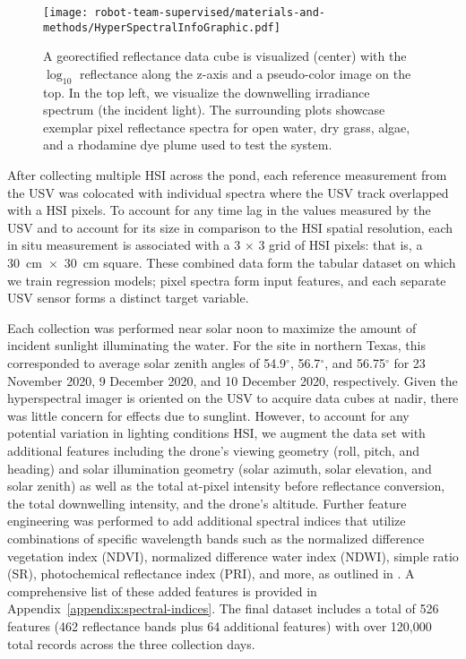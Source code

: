 \begin{figure}[H]
  \centering
  \texttt{[image: robot-team-supervised/materials-and-methods/HyperSpectralInfoGraphic.pdf]}
  \caption{A georectified reflectance data cube is visualized (center) with the
    $\log_{10}$ reflectance along the z-axis and a pseudo-color image on the
    top. In the top left, we visualize the downwelling irradiance spectrum (the
    incident light). The surrounding plots showcase exemplar pixel reflectance
    spectra for open water, dry grass, algae, and a rhodamine dye plume used to
    test the system.\label{fig:hsi-infographic}}
\end{figure}


After collecting multiple HSI across the pond, each reference measurement from
the USV was colocated with individual spectra where the USV track overlapped
with a HSI pixels. To account for any time lag in the values measured by the USV
and to account for its size in comparison to the HSI spatial resolution, each in
situ measurement is associated with a 3 $\times$ 3 grid of HSI pixels: that is, a
\mbox{30 cm $\times$ 30 cm} square. These combined data form the tabular dataset on which
we train regression models; pixel spectra form input features, and each separate
USV sensor forms a distinct target variable.


Each collection was performed near solar noon to maximize the amount of incident
sunlight illuminating the water. For the site in northern Texas, this
corresponded to average solar zenith angles of 54.9$^{\circ}$, 56.7$^{\circ}$,
and 56.75$^{\circ}$ for 23 November 2020, 9 December 2020, and 10 December 2020,
respectively. Given the hyperspectral imager is oriented on the USV to acquire
data cubes at nadir, there was little concern for effects due to sunglint.
However, to account for any potential variation in lighting conditions 
HSI, we augment the data set with additional features including the
drone's viewing geometry (roll, pitch, and heading) and solar illumination
geometry (solar azimuth, solar
elevation, and solar zenith) as well as the total at-pixel intensity before
reflectance conversion, the total downwelling intensity, and the drone's
altitude. Further feature engineering was performed to add additional spectral
indices that utilize combinations of specific wavelength bands such as the
normalized difference vegetation index (NDVI), normalized difference water index
(NDWI), simple ratio (SR), photochemical reflectance index (PRI), and more, as
outlined in \cite{envi_vegetation_indices,
  thenkabail2018hyperspectral,kaufman1992atmospherically, SpectralIndexWheat}. A
comprehensive list of these added features is provided in
Appendix~\ref{appendix:spectral-indices}. The final dataset includes a total of
526 features (462 reflectance bands plus 64 additional features) with over
120,000 total records across the three collection days.


